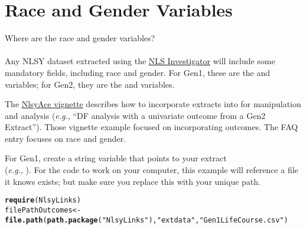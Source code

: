 \documentclass{article}\usepackage[]{graphicx}\usepackage[]{color}
\makeatletter
\newcommand{\hlstr}[1]{\textcolor[rgb]{0.192,0.494,0.8}{#1}}%
\newcommand{\hlstd}[1]{\textcolor[rgb]{0.345,0.345,0.345}{#1}}%
\newcommand{\hlkwb}[1]{\textcolor[rgb]{0.69,0.353,0.396}{#1}}%
\newcommand{\hlkwd}[1]{\textcolor[rgb]{0.737,0.353,0.396}{\textbf{#1}}}%
\newenvironment{kframe}{%
 \def\at@end@of@kframe{}%
 \ifinner\ifhmode%
  \def\at@end@of@kframe{\end{minipage}}%
  \begin{minipage}{\columnwidth}%
 \fi\fi%
 \def\FrameCommand##1{\hskip\@totalleftmargin \hskip-\fboxsep
 \colorbox{shadecolor}{##1}\hskip-\fboxsep
     \hskip-\linewidth \hskip-\@totalleftmargin \hskip\columnwidth}%
 \MakeFramed {\advance\hsize-\width
   \@totalleftmargin\z@ \linewidth\hsize
   \@setminipage}}%
 {\par\unskip\endMakeFramed%
 \at@end@of@kframe}
\newenvironment{knitrout}{}{} %
\makeatother
\begin{document}
\section{Race and Gender Variables}
\textsf{Where are the race and gender variables?}\\ \\
Any NLSY dataset extracted using the \href{http://cran.r-project.org/web/packages/NlsyLinks/vignettes/NlsInvestigator.pdf}{NLS Investigator} will include some mandatory fields, including race and gender.  For Gen1, these are the  and  variables; for Gen2, they are the  and  variables.

The \href{http://cran.r-project.org/web/packages/NlsyLinks/vignettes/NlsyAce.pdf}{NlsyAce vignette} describes how to incorporate extracts into \R{} for manipulation and analysis (\emph{e.g.}, ``DF analysis with a univariate outcome from a Gen2 Extract'').  Those vignette example focused on incorporating outcomes.  The FAQ entry focuses on race and gender.

For Gen1, create a string variable that points to your extract\\(\emph{e.g.}, ).  For the code to work on your computer, this example will reference a file it knows exists; but make sure you replace this with your unique path.
\begin{knitrout}
\color{fgcolor}\begin{kframe}
\begin{alltt}
\hlkwd{require}\hlstd{(NlsyLinks)}
\hlstd{filePathOutcomes} \hlkwb{<-} \hlkwd{file.path}\hlstd{(}\hlkwd{path.package}\hlstd{(}\hlstr{"NlsyLinks"}\hlstd{),} \hlstr{"extdata"}\hlstd{,} \hlstr{"Gen1LifeCourse.csv"}\hlstd{)}
\end{alltt}
\end{kframe}
\end{knitrout}
\end{document}
